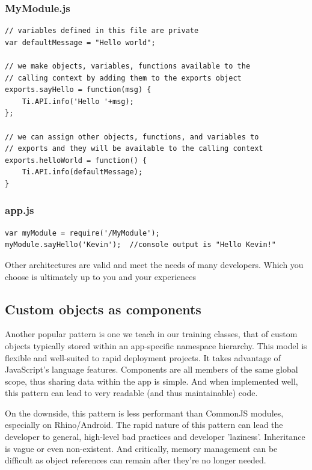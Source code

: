 \documentclass[11pt]{book}
\begin{document}
\subsubsection{MyModule.js}
\begin{lstlisting}[frame=single]
// variables defined in this file are private
var defaultMessage = "Hello world";

// we make objects, variables, functions available to the
// calling context by adding them to the exports object
exports.sayHello = function(msg) {
	Ti.API.info('Hello '+msg);
};

// we can assign other objects, functions, and variables to
// exports and they will be available to the calling context
exports.helloWorld = function() {
	Ti.API.info(defaultMessage);
}
\end{lstlisting}

\subsubsection{app.js}
\begin{lstlisting}[frame=single]
var myModule = require('/MyModule');
myModule.sayHello('Kevin');  //console output is "Hello Kevin!"
\end{lstlisting}

Other architectures are valid and meet the needs of many developers. Which you choose is ultimately up to you and your experiences

\subsection{Custom objects as components}
Another popular pattern is one we teach in our training classes, that of custom objects typically stored within an app-specific namespace hierarchy. This model is flexible and well-suited to rapid deployment projects. It takes advantage of JavaScript's language features. Components are all members of the same global scope, thus sharing data within the app is simple. And when implemented well, this pattern can lead to very readable (and thus maintainable) code.

On the downside, this pattern is less performant than CommonJS modules, especially on Rhino/Android. The rapid nature of this pattern can lead the developer to general, high-level bad practices and developer 'laziness'. Inheritance is vague or even non-existent. And critically, memory management can be difficult as object references can remain after they're no longer needed.
\end{document}
